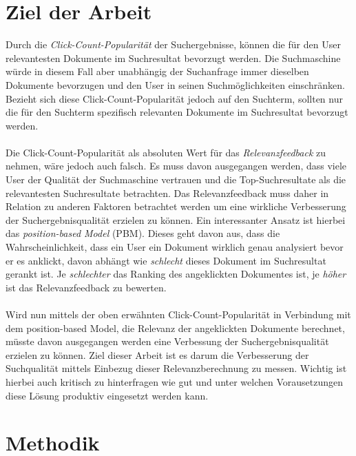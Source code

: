 \section{Ziel der Arbeit}
\label{sec:Einfuehrung:ZielArbeit}

Durch die \textit{Click-Count-Popularität} der Suchergebnisse, können die für den User relevantesten Dokumente im Suchresultat bevorzugt werden. Die Suchmaschine würde in diesem Fall aber unabhängig der Suchanfrage immer dieselben Dokumente bevorzugen und den User in seinen Suchmöglichkeiten einschränken. Bezieht sich diese Click-Count-Popularität jedoch auf den Suchterm, sollten nur die für den Suchterm spezifisch relevanten Dokumente im Suchresultat bevorzugt werden.
\\
\\
Die Click-Count-Popularität als absoluten Wert für das \textit{Relevanzfeedback} zu nehmen, wäre jedoch auch falsch. Es muss davon ausgegangen werden, dass viele User der Qualität der Suchmaschine vertrauen und die Top-Suchresultate als die relevantesten Suchresultate betrachten. \cite{Joachims} Das Relevanzfeedback muss daher in Relation zu anderen Faktoren betrachtet werden um eine wirkliche Verbesserung der Suchergebnisqualität erzielen zu können. Ein interessanter Ansatz ist hierbei das \textit{position-based Model} (PBM). \cite{chuklin2015} Dieses geht davon aus, dass die Wahrscheinlichkeit, dass ein User ein Dokument wirklich genau analysiert bevor er es anklickt, davon abhängt wie \textit{schlecht} dieses Dokument im Suchresultat gerankt ist. Je \textit{schlechter} das Ranking des angeklickten Dokumentes ist, je \textit{höher} ist das Relevanzfeedback zu bewerten.
\\
\\
Wird nun mittels der oben erwähnten Click-Count-Popularität in Verbindung mit dem position-based Model, die Relevanz der angeklickten Dokumente berechnet, müsste davon ausgegangen werden eine Verbessung der Suchergebnisqualität erzielen zu können. Ziel dieser Arbeit ist es darum die Verbesserung der Suchqualität mittels Einbezug dieser Relevanzberechnung zu messen. Wichtig ist hierbei auch kritisch zu hinterfragen wie gut und unter welchen Vorausetzungen diese Lösung produktiv eingesetzt werden kann.  

\section{Methodik}
\label{sec:Einfuehrung:Methodik}


